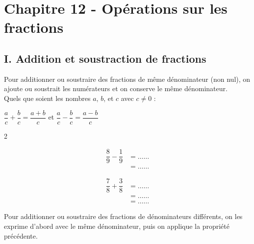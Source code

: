 \section*{Chapitre 12 - Opérations sur les fractions}

\subsection*{I. Addition et soustraction de fractions}

\vspace{0.3cm}
\begin{Propriété}
Pour additionner ou soustraire des fractions de même dénominateur (non nul), on ajoute ou soustrait les numérateurs et on conserve le même dénominateur. \\

Quels que soient les nombres $a$, $b$, et $c$ avec $c\neq 0$ : \\
\begin{center}
$ \dfrac{a}{c}+ \dfrac{b}{c}= \dfrac{a+b}{c}$ et $ \dfrac{a}{c} - \dfrac{b}{c} = \dfrac{a-b}{c} $
\end{center}
\end{Propriété}


\begin{Exemples}
\begin{multicols}{2}

$$\begin{aligned}\dfrac{8}{9} - \dfrac{1}{9} &= \ldots \ldots\\
	&=\ldots\ldots
	\end{aligned}$$

\columnbreak

$$\begin{aligned}\dfrac{7}{8} + \dfrac{3}{8}&= \ldots\ldots\\
	&=\ldots\ldots\\
	&=\ldots\ldots
	\end{aligned}$$

\end{multicols}
\end{Exemples}


\begin{Méthode}
Pour additionner ou soustraire des fractions de dénominateurs différents, on les exprime d'abord avec le même dénominateur, puis on applique la propriété précédente.
\end{Méthode}

